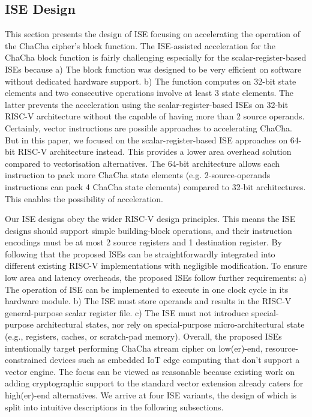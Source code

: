 \subsection{ISE Design}

This section presents the design of ISE focusing on accelerating the operation of the ChaCha cipher's block function. 
The ISE-assisted acceleration for the ChaCha block function is fairly challenging especially for the scalar-register-based ISEs because 
a) The block function was designed to be very efficient on software without dedicated hardware support. 
b) The function computes on 32-bit state elements and two consecutive operations involve at least 3 state elements. 
The latter prevents the acceleration using the scalar-register-based ISEs on 32-bit RISC-V architecture without the capable of having more than 2 source operands.
Certainly, vector instructions are possible approaches to accelerating ChaCha. 
But in this paper, we focused on the scalar-register-based ISE approaches on 64-bit RISC-V architecture instead. 
This provides a lower area overhead solution compared to vectorisation alternatives. 
The 64-bit architecture allows each instruction to pack more ChaCha state elements (e.g. 2-source-operands instructions can pack 4 ChaCha state elements) compared to 32-bit architectures. 
This enables the possibility of acceleration.

Our ISE designs obey the wider RISC-V design principles. 
This means the ISE designs should support simple building-block operations, and their instruction encodings must be at most 2 source registers and 1 destination register. 
By following that the proposed ISEs can be straightforwardly integrated into different existing RISC-V implementations with negligible modification.
To ensure low area and latency overheads, the proposed ISEs follow further requirements: 
a) The operation of ISE can be implemented to execute in one clock cycle in its hardware module. 
b) The ISE must store operands and results in the RISC-V general-purpose scalar register file. 
c) The ISE must not introduce special-purpose architectural states, nor rely on special-purpose micro-architectural state (e.g., registers, caches, or scratch-pad memory).
Overall, the proposed ISEs intentionally target performing ChaCha stream cipher on low(er)-end, resource-constrained devices such as embedded IoT edge computing that don't support a vector engine. The focus can be viewed as reasonable because existing work on adding cryptographic support to the standard vector extension \cite{riscv:ext:vector:draft} already caters for high(er)-end alternatives. 
We arrive at four ISE variants, the design of which is split into intuitive descriptions in the following subsections. 

